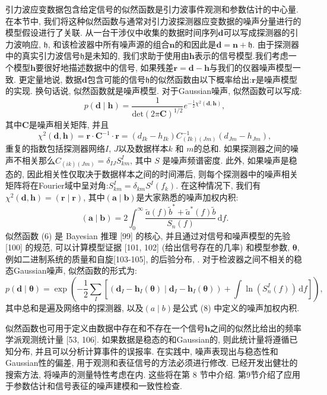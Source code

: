 \documentclass[a4paper]{\documentclassname}
\def\b{\boldsymbol}
\def\d{\mathrm{d}}
\def\ti{\tilde}
\theoremstyle{definition}
\begin{document}
引力波应变数据包含给定信号的似然函数是引力波事件观测和参数估计的中心量. 在本节中, 我们将这种似然函数与通常对引力波探测器应变数据的噪声分量进行的模型假设进行了关联. 从一台干涉仪中收集的数据时间序列${\b {d}}$可以写成探测器的引力波响应, $\mathfrak{h}$, 和该检波器中所有噪声源的组合${\b {n}}$的和因此是${\b{ d}}={\b {n}}+\mathfrak{h}$. 由于探测器中的真实引力波信号$\mathfrak{h}$是未知的, 我们求助于使用由$\b{h}$表示的信号模型.我们考虑一个模型$\b{h}$要很好地描述数据中的信号, 如果残差${\b {r}} = {\b {d}} - \b{h}$与我们的仪器噪声模型一致. 更定量地说, 数据${\b {d}}$包含可能的信号$\mathfrak{h}$的似然函数由以下概率给出:${\b{ r}}$是噪声模型的实现. 换句话说, 似然函数就是噪声模型. 对于Gaussian噪声, 似然函数可以写成:
\begin{equation}
    p(\b {d}\mid\b{h})=\frac{1}{\mathrm{det}(2\pi\b{C})^{1/2}}e^{-\frac{1}{2}\chi^2(\b {d},\b{h})},
\end{equation}
其中${\b {C}}$是噪声相关矩阵, 并且
\begin{equation}
    \chi^2(\b {d},\b{h})=\b{r}\cdot\b{C}^{-1}\cdot\b{r}=(d_{Ik}-h_{Ik}){C}^{-1}_{(Ik)(Jm)}(d_{Jm}-h_{Jm}),
\end{equation}
重复的指数包括探测器网络$I$,  $J$以及数据样本$ k$ 和 $m$的总和. 如果探测器之间的噪声不相关那么$C_{ (ik)  (Jm) } = \delta_{IJ} S^I_{km}$, 其中 $S$ 是噪声频谱密度. 此外, 如果噪声是稳态的, 因此相关性仅取决于数据样本之间的时间滞后, 则每个探测器中的噪声相关矩阵将在Fourier域中呈对角:$S^{I}_{km} = \delta_{km} S^{I} (f_k) $. 在这种情况下, 我们有$\chi^2 ({\b {d}} ,  {\b {h}})  =  ({\b {r}} \mid{\b {r}}) $, 其中$ ({\b {a}} \mid{\b {b}}) $是大家熟悉的噪声加权内积:
\begin{equation}
     ({\b {a}} \mid{\b {b}}) =2\int_0^\infty\frac{\ti{a}(f)\ti{b}^\ast+\ti{a}^\ast(f)\ti{b}}{S_n(f)}\,\d f.
\end{equation}
似然函数  (6)  是 Bayesian 推理 [99] 的核心, 并且通过对信号和噪声模型的先验 [100] 的规范, 可以计算模型证据 [101,  102] (给出信号存在的几率) 和模型参数, $\b{\theta}$, 例如二进制系统的质量和自旋[103-105], 的后验分布, . 对于检波器之间不相关的稳态Gaussian噪声, 似然函数的形式为:
\begin{equation}
    p(\b {d}\mid\b{\theta})=\exp\left(-\frac{1}{2}\sum_I\left[({\b {d}_I} - \b{h}_I(\b{\theta})\mid{\b {d}_I} - \b{h}_I(\b{\theta}))+\int\ln(S_n^I(f))\,\d f\right]\right),
\end{equation}
其中总和是遍及网络中的探测器, 以及$ (a\mid b) $是公式 (8) 中定义的噪声加权内积. 

似然函数也可用于定义由数据中存在和不存在一个信号$\b{h}$之间的似然比给出的频率学派观测统计量 [53,  106]. 如果数据是稳态的和Gaussian的, 则此统计量将遵循已知分布, 并且可以分析计算事件的误报率. 在实践中, 噪声表现出与稳态性和Gaussian性的偏差, 用于观测和表征信号的方法必须进行修改. 已经开发出健壮的搜索方法, 将噪声的测量特性考虑在内. 这些将在第 8 节中介绍. 第9节介绍了应用于参数估计和信号表征的噪声建模和一致性检查. 
\end{document}
